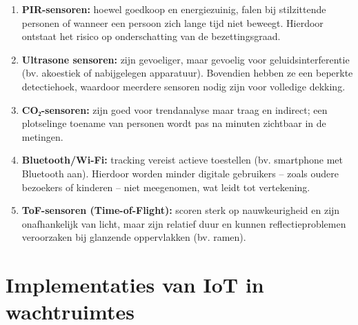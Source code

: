 \begin{enumerate}
    \item{\textbf{PIR-sensoren:} hoewel goedkoop en energiezuinig, falen bij stilzittende personen of wanneer een persoon zich lange tijd niet beweegt. Hierdoor ontstaat het risico op onderschatting van de bezettingsgraad.}
    \item{\textbf{Ultrasone sensoren:} zijn gevoeliger, maar gevoelig voor geluidsinterferentie (bv. akoestiek of nabijgelegen apparatuur). Bovendien hebben ze een beperkte detectiehoek, waardoor meerdere sensoren nodig zijn voor volledige dekking.}
    \item{\textbf{CO₂-sensoren:} zijn goed voor trendanalyse maar traag en indirect; een plotselinge toename van personen wordt pas na minuten zichtbaar in de metingen.}
    \item{\textbf{Bluetooth/Wi-Fi:} tracking vereist actieve toestellen (bv. smartphone met Bluetooth aan). Hierdoor worden minder digitale gebruikers – zoals oudere bezoekers of kinderen – niet meegenomen, wat leidt tot vertekening.}
    \item{\textbf{ToF-sensoren (Time-of-Flight):} scoren sterk op nauwkeurigheid en zijn onafhankelijk van licht, maar zijn relatief duur en kunnen reflectieproblemen veroorzaken bij glanzende oppervlakken (bv. ramen).}
\end{enumerate}


\section{Implementaties van IoT in wachtruimtes}

